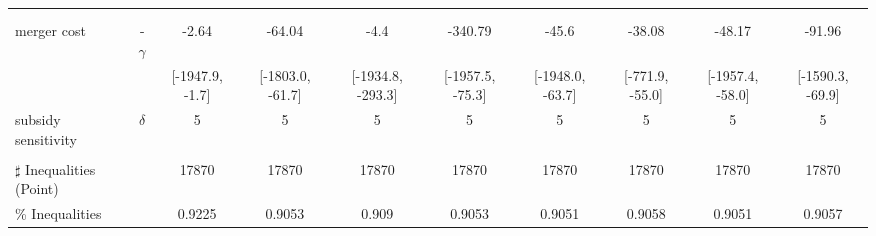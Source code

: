 \begin{tabular}{@{\extracolsep{5pt}}lccccccccc}
 &  &  &  &  &  &  &  &  &  \\
 &  &  &  &  &  &  &  &  &  \\
merger cost & -$\gamma$ & -2.64 & -64.04 & -4.4 & -340.79 & -45.6 & -38.08 & -48.17 & -91.96 \\
 &  & [-1947.9, -1.7] & [-1803.0, -61.7] & [-1934.8, -293.3] & [-1957.5, -75.3] & [-1948.0, -63.7] & [-771.9, -55.0] & [-1957.4, -58.0] & [-1590.3, -69.9] \\
subsidy sensitivity & $\delta$ & 5 & 5 & 5 & 5 & 5 & 5 & 5 & 5 \\
 &  &  &  &  &  &  &  &  &  \\
\hline 
$\sharp$ Inequalities (Point) &  & 17870 & 17870 & 17870 & 17870 & 17870 & 17870 & 17870 & 17870 \\
\% Inequalities &  & 0.9225 & 0.9053 & 0.909 & 0.9053 & 0.9051 & 0.9058 & 0.9051 & 0.9057 \\
\bottomrule 
\end{tabular}

